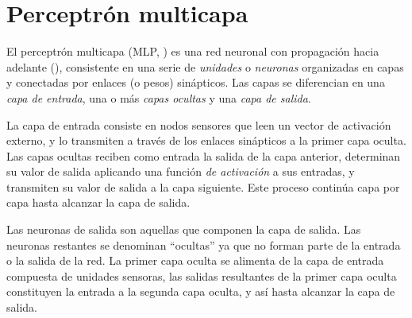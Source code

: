 \documentclass[12pt,bibliography=oldstyle,DIV=12,parskip=half-]{scrreprt}
\newcommand{\e}{\emph}
\begin{document}
%
%
%
\section{Perceptrón multicapa}
%
\newcommand{\feedforward}{con propagación hacia adelante}
%
El perceptrón multicapa (MLP, )
\cite{mlp1,mlp2} es una red neuronal \feedforward{} (),
consistente en una serie de \e{unidades} o \e{neuronas} organizadas en
capas y conectadas por enlaces (o pesos) sinápticos.
Las capas se diferencian en una \e{capa
  de entrada}, una o más \e{capas ocultas} y una \e{capa de salida}.

La capa de entrada consiste en nodos sensores que leen un vector
de activación externo, y lo transmiten a través de los enlaces
sinápticos a la primer capa oculta. Las capas ocultas reciben como
entrada la salida de la capa anterior, determinan su valor de salida
aplicando una función \e{de activación} a sus entradas, y transmiten
su valor de salida a la capa siguiente. Este proceso continúa capa por
capa hasta alcanzar la capa de salida.

Las neuronas de salida son aquellas que componen la capa de salida.
Las neuronas restantes se denominan ``ocultas'' ya que no forman parte
de la entrada o la salida de la red. La primer capa oculta se alimenta
de la capa de entrada compuesta de unidades sensoras, las salidas
resultantes de la primer capa oculta constituyen la entrada a la
segunda capa oculta, y así hasta alcanzar la capa de salida.
\end{document}
